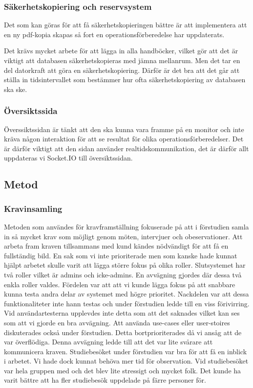 \documentclass{article}
\begin{document}
\subsubsection{Säkerhetskopiering och reservsystem}
Det som kan göras för att få säkerhetskopieringen bättre är att implementera att en ny pdf-kopia skapas så fort en operationsförberedelse har uppdaterats.

Det krävs mycket arbete för att lägga in alla handböcker, vilket gör att det är viktigt att databasen säkerhetskopieras med jämna mellanrum. Men det tar en del datorkraft att göra en säkerhetskopiering. Därför är det bra att det går att ställa in tidsintervallet som bestämmer hur ofta säkerhetskopiering av databasen ska ske.

\subsubsection{Översiktssida}
Överssiktssidan är tänkt att den ska kunna vara framme på en monitor och inte kräva någon interaktion för att se resultat för olika operationsförberedelser. Det är därför viktigt att den sidan använder realtidskommunikation, det är därför allt uppdateras vi Socket.IO till översiktssidan.

  
\subsection{Metod}

\subsubsection{Kravinsamling}
Metoden som användes för kravframställning fokuserade på att i förstudien samla in så mycket krav som möjligt genom möten, intervjuer och obeservationer. Att arbeta fram kraven tillsammans med kund kändes nödvändigt för att få en fullständig bild. En sak som vi inte prioriterade men som kanske hade kunnat hjälpt arbetet skulle varit att lägga större fokus på olika roller. Slutsystemet har två roller vilket är admins och icke-admins. En avvägning gjordes där dessa två enkla roller valdes. Fördelen var att att vi kunde lägga fokus på att snabbare kunna testa andra delar av systemet med högre prioritet. Nackdelen var att dessa funktionaliteter inte hann testas och under förstudien ledde till en viss förivirring. Vid användartesterna upplevdes inte detta som att det saknades vilket kan ses som att vi gjorde en bra avvägning. %
Att använda use-cases eller user-stoires diskuterades också under förstudien. Detta bortprioriterades då vi ansåg att de var överflödiga. Denna avvägning ledde till att det var lite svårare att kommunicera kraven. 
Studiebesöket under förstudien var bra för att få en inblick i arbetet. Vi hade dock kunnat behöva mer tid för observation. Vid studiebesöket var hela gruppen med och det blev lite stressigt och mycket folk. Det kunde ha varit bättre att ha fler studiebesök uppdelade på färre personer för.
\end{document}
